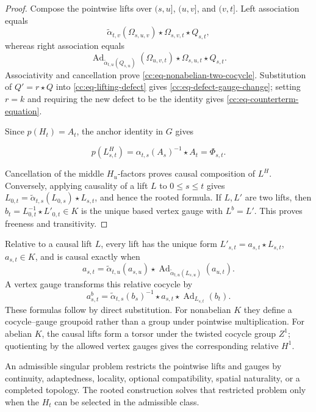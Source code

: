 \documentclass[10pt,reqno]{amsart}
\theoremstyle{plain}
\theoremstyle{definition}
\theoremstyle{remark}
\begin{document}
\begin{proof}
Compose the pointwise lifts over \((s,u]\), \((u,v]\), and \((v,t]\).
Left association equals
\[
 \widetilde\alpha_{t,v}(\Omega_{s,u,v})\star
 \Omega_{s,v,t}\star Q_{s,t},
\]
whereas right association equals
\[
 \operatorname{Ad}_{\widetilde\alpha_{t,u}(Q_{s,u})}
 (\Omega_{u,v,t})\star\Omega_{s,u,t}\star Q_{s,t}.
\]
Associativity and cancellation prove
\eqref{cc:eq-nonabelian-two-cocycle}.  Substitution of
\(Q'=r\star Q\) into \eqref{cc:eq-lifting-defect} gives
\eqref{cc:eq-defect-gauge-change}; setting \(r=k\) and requiring the new
defect to be the identity gives \eqref{cc:eq-counterterm-equation}.

Since \(p(H_t)=A_t\), the anchor identity in \(G\) gives

\[
 p(L^H_{s,t})
 =\alpha_{t,s}(A_s)^{-1}\star A_t=\Phi_{s,t}.
\]

Cancellation of the middle \(H_u\)-factors proves causal composition of
\(L^H\).  Conversely, applying causality of a lift \(L\) to \(0\le s\le t\)
gives \(L_{0,t}=\widetilde\alpha_{t,s}(L_{0,s})\star L_{s,t}\), and hence
the rooted formula.  If \(L,L'\) are two lifts, then
\(b_t=L_{0,t}^{-1}\star L'_{0,t}\in K\) is the unique based vertex gauge
with \(L^b=L'\).  This proves freeness and transitivity.
\end{proof}

Relative to a causal lift \(L\), every lift has the unique form
\(L'_{s,t}=a_{s,t}\star L_{s,t}\), \(a_{s,t}\in K\), and is causal
exactly when
\begin{equation}
 a_{s,t}=\widetilde\alpha_{t,u}(a_{s,u})\star
 \operatorname{Ad}_{\widetilde\alpha_{t,u}(L_{s,u})}(a_{u,t}).
 \label{cc:eq-relative-one-cocycle}
\end{equation}
A vertex gauge transforms this relative cocycle by
\begin{equation}
 a^b_{s,t}=\widetilde\alpha_{t,s}(b_s)^{-1}\star a_{s,t}\star
 \operatorname{Ad}_{L_{s,t}}(b_t).
 \label{cc:eq-relative-gauge}
\end{equation}
These formulas follow by direct substitution.  For nonabelian \(K\) they
define a cocycle--gauge groupoid rather than a group under pointwise
multiplication.  For abelian \(K\), the causal lifts form a torsor under
the twisted cocycle group \(Z^1\); quotienting by the allowed vertex
gauges gives the corresponding relative \(H^1\).

An admissible singular problem restricts
the pointwise lifts and gauges by continuity, adaptedness, locality,
optional compatibility, spatial naturality, or a completed topology.  The
rooted construction solves that restricted problem only when the \(H_t\)
can be selected in the admissible class.
\end{document}
